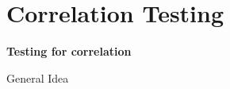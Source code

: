\section{Correlation Testing}

\begin{frame}{}

  \begin{center}
    {\large {\bf
        Testing for correlation
    }}
  \end{center}
  
\end{frame}

\begin{frame}{General Idea}
\end{frame}



